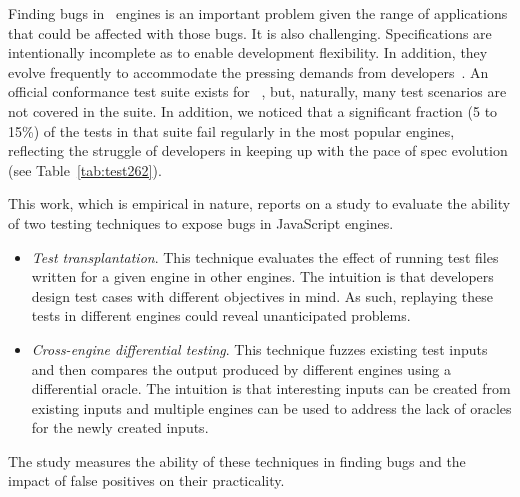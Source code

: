 \documentclass[smallextended]{svjour3}
\begin{document}
Finding bugs in \js\ engines is an important problem given the range
of applications that could be affected with those bugs. It is also
challenging.  Specifications are intentionally incomplete as to enable
development flexibility. In addition, they evolve frequently to
accommodate the pressing demands from
developers~\cite{ecmas262-spec-repo}. An official conformance test
suite exists for \js~\cite{tc39-github}, but, naturally, many test
scenarios are not covered in the suite. In addition, we noticed that a
significant fraction (5 to 15\%) of the tests in that suite fail
regularly in the most popular engines, reflecting the struggle of developers in keeping
up with the pace of spec evolution (see Table~\ref{tab:test262}).

This work, which is empirical in nature, reports on a study to evaluate
the ability of two testing techniques to expose bugs in JavaScript engines.

\begin{itemize}[topsep=0pt,parsep=0pt,partopsep=2pt,labelwidth=0cm,align=left,itemindent=-0.25cm]
\item \emph{Test transplantation}.
  This technique evaluates the effect of running test files
  written for a given engine in other engines. The intuition is that
  developers design test cases with different objectives in mind. As
  such, replaying these tests in different engines could reveal
  unanticipated problems.

\item \emph{Cross-engine differential testing}.  This technique fuzzes
  existing test inputs~\cite{fuzz-testing-history} and then compares
  the output produced by different engines using a differential
  oracle. The intuition is that interesting inputs can be created from
  existing inputs and multiple engines can be used to address the lack
  of oracles for the newly created inputs.
\end{itemize}

The study measures the ability of these techniques in finding bugs and
the impact of false positives on their practicality. 

\end{document}
